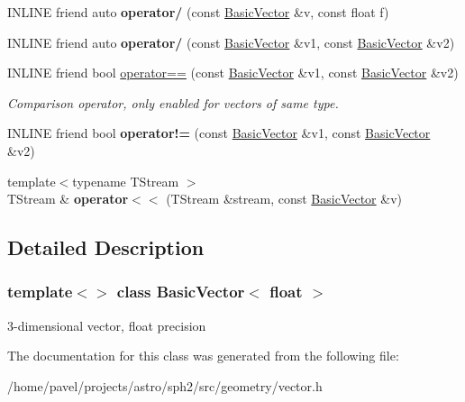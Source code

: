 \begin{DoxyCompactItemize}
\item 
\hypertarget{classBasicVector_3_01float_01_4_a75b021a97f5880d9a5edbebf7ecd6075}{}\label{classBasicVector_3_01float_01_4_a75b021a97f5880d9a5edbebf7ecd6075} 
I\+N\+L\+I\+NE friend auto {\bfseries operator/} (const \hyperlink{classBasicVector}{Basic\+Vector} \&v, const float f)
\item 
\hypertarget{classBasicVector_3_01float_01_4_aa1877a346e7aa1ea57737628a58589e7}{}\label{classBasicVector_3_01float_01_4_aa1877a346e7aa1ea57737628a58589e7} 
I\+N\+L\+I\+NE friend auto {\bfseries operator/} (const \hyperlink{classBasicVector}{Basic\+Vector} \&v1, const \hyperlink{classBasicVector}{Basic\+Vector} \&v2)
\item 
\hypertarget{classBasicVector_3_01float_01_4_a89893ab07524d683177877fc3f1a34d6}{}\label{classBasicVector_3_01float_01_4_a89893ab07524d683177877fc3f1a34d6} 
I\+N\+L\+I\+NE friend bool \hyperlink{classBasicVector_3_01float_01_4_a89893ab07524d683177877fc3f1a34d6}{operator==} (const \hyperlink{classBasicVector}{Basic\+Vector} \&v1, const \hyperlink{classBasicVector}{Basic\+Vector} \&v2)
\begin{DoxyCompactList}\small\item\em Comparison operator, only enabled for vectors of same type. \end{DoxyCompactList}\item 
\hypertarget{classBasicVector_3_01float_01_4_a214517caa81358c78e46ffea40acab05}{}\label{classBasicVector_3_01float_01_4_a214517caa81358c78e46ffea40acab05} 
I\+N\+L\+I\+NE friend bool {\bfseries operator!=} (const \hyperlink{classBasicVector}{Basic\+Vector} \&v1, const \hyperlink{classBasicVector}{Basic\+Vector} \&v2)
\item 
\hypertarget{classBasicVector_3_01float_01_4_a326bb814a09dab7d58edd595b3db3813}{}\label{classBasicVector_3_01float_01_4_a326bb814a09dab7d58edd595b3db3813} 
{\footnotesize template$<$typename T\+Stream $>$ }\\T\+Stream \& {\bfseries operator$<$$<$} (T\+Stream \&stream, const \hyperlink{classBasicVector}{Basic\+Vector} \&v)
\end{DoxyCompactItemize}


\subsection{Detailed Description}
\subsubsection*{template$<$$>$\newline
class Basic\+Vector$<$ float $>$}

3-\/dimensional vector, float precision 

The documentation for this class was generated from the following file\+:\begin{DoxyCompactItemize}
\item 
/home/pavel/projects/astro/sph2/src/geometry/vector.\+h\end{DoxyCompactItemize}
